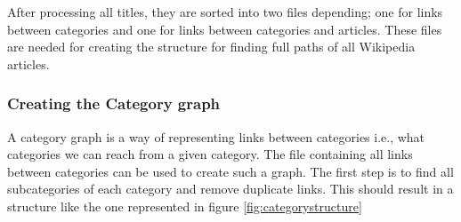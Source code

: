 
After processing all titles, they are sorted into two files depending; one for links between categories and one for links between categories and articles. These files are needed for creating the structure for finding full paths of all Wikipedia articles. 



\subsubsection{Creating the Category graph}
A category graph is a way of representing links between categories i.e., what categories we can reach from a given category. The file containing all links between categories can be used to create such a graph. The first step is to find all subcategories of each category and remove duplicate links. This should result in a structure like the one represented in figure \ref{fig:categorystructure}

